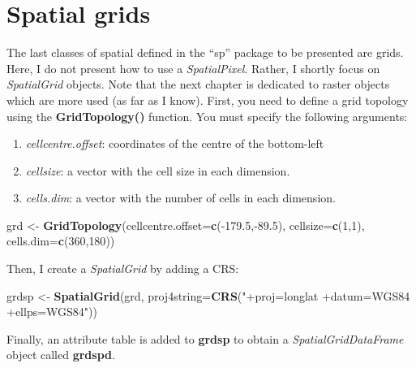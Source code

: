 \documentclass[]{report}
\newenvironment{Shaded}{\begin{snugshade}}{\end{snugshade}}
\newcommand{\KeywordTok}[1]{\textcolor[rgb]{0.13,0.29,0.53}{\textbf{{#1}}}}
\newcommand{\DataTypeTok}[1]{\textcolor[rgb]{0.13,0.29,0.53}{{#1}}}
\newcommand{\DecValTok}[1]{\textcolor[rgb]{0.00,0.00,0.81}{{#1}}}
\newcommand{\FloatTok}[1]{\textcolor[rgb]{0.00,0.00,0.81}{{#1}}}
\newcommand{\StringTok}[1]{\textcolor[rgb]{0.31,0.60,0.02}{{#1}}}
\newcommand{\NormalTok}[1]{{#1}}
\providecommand{\tightlist}{%
  \setlength{\itemsep}{0pt}\setlength{\parskip}{0pt}}
\begin{document}
\chapter{Spatial grids}\label{spatial-grids}

The last classes of spatial defined in the ``sp'' package to be
presented are grids. Here, I do not present how to use a
\emph{SpatialPixel}. Rather, I shortly focus on \emph{SpatialGrid}
objects. Note that the next chapter is dedicated to raster objects which
are more used (as far as I know). First, you need to define a grid
topology using the \textbf{GridTopology()} function. You must specify
the following arguments:

\begin{enumerate}
\def\labelenumi{\arabic{enumi}.}
\tightlist
\item
  \emph{cellcentre.offset}: coordinates of the centre of the bottom-left
\item
  \emph{cellsize}: a vector with the cell size in each dimension.
\item
  \emph{cells.dim}: a vector with the number of cells in each dimension.
\end{enumerate}

\begin{Shaded}
\begin{Highlighting}[]
\NormalTok{grd <-}\StringTok{ }\KeywordTok{GridTopology}\NormalTok{(}\DataTypeTok{cellcentre.offset=}\KeywordTok{c}\NormalTok{(-}\FloatTok{179.5}\NormalTok{,-}\FloatTok{89.5}\NormalTok{), }\DataTypeTok{cellsize=}\KeywordTok{c}\NormalTok{(}\DecValTok{1}\NormalTok{,}\DecValTok{1}\NormalTok{), }\DataTypeTok{cells.dim=}\KeywordTok{c}\NormalTok{(}\DecValTok{360}\NormalTok{,}\DecValTok{180}\NormalTok{))}
\end{Highlighting}
\end{Shaded}

Then, I create a \emph{SpatialGrid} by adding a CRS:

\begin{Shaded}
\begin{Highlighting}[]
\NormalTok{grdsp <-}\StringTok{ }\KeywordTok{SpatialGrid}\NormalTok{(grd, }\DataTypeTok{proj4string=}\KeywordTok{CRS}\NormalTok{(}\StringTok{"+proj=longlat +datum=WGS84 +ellps=WGS84"}\NormalTok{))}
\end{Highlighting}
\end{Shaded}

Finally, an attribute table is added to \textbf{grdsp} to obtain a
\emph{SpatialGridDataFrame} object called \textbf{grdspd}.
\end{document}
